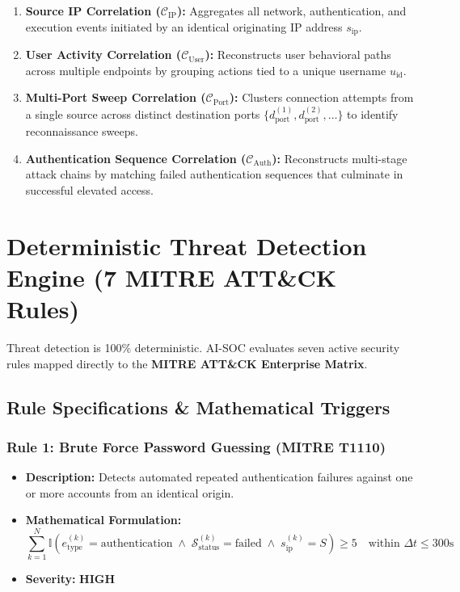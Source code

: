 \documentclass[11pt,a4paper]{article}
\begin{document}
\begin{enumerate}
    \item \textbf{Source IP Correlation ($\mathcal{C}_{\text{IP}}$):} Aggregates all network, authentication, and execution events initiated by an identical originating IP address $s_{\text{ip}}$.
    \item \textbf{User Activity Correlation ($\mathcal{C}_{\text{User}}$):} Reconstructs user behavioral paths across multiple endpoints by grouping actions tied to a unique username $u_{\text{id}}$.
    \item \textbf{Multi-Port Sweep Correlation ($\mathcal{C}_{\text{Port}}$):} Clusters connection attempts from a single source across distinct destination ports $\{d_{\text{port}}^{(1)}, d_{\text{port}}^{(2)}, \dots\}$ to identify reconnaissance sweeps.
    \item \textbf{Authentication Sequence Correlation ($\mathcal{C}_{\text{Auth}}$):} Reconstructs multi-stage attack chains by matching failed authentication sequences that culminate in successful elevated access.
\end{enumerate}

\section{Deterministic Threat Detection Engine (7 MITRE ATT\&CK Rules)}

Threat detection is 100\% deterministic. AI-SOC evaluates seven active security rules mapped directly to the \textbf{MITRE ATT\&CK Enterprise Matrix}.

\subsection{Rule Specifications \& Mathematical Triggers}

\subsubsection{Rule 1: Brute Force Password Guessing (MITRE T1110)}
\begin{itemize}
    \item \textbf{Description:} Detects automated repeated authentication failures against one or more accounts from an identical origin.
    \item \textbf{Mathematical Formulation:}
    \begin{equation}
        \sum_{k=1}^{N} \mathbb{I}\left( e_{\text{type}}^{(k)} = \text{authentication} \;\land\; \mathcal{S}_{\text{status}}^{(k)} = \text{failed} \;\land\; s_{\text{ip}}^{(k)} = S \right) \ge 5 \quad \text{within } \Delta t \le 300\text{s}
    \end{equation}
    \item \textbf{Severity:} \textcolor{alertorange}{\textbf{HIGH}}
\end{itemize}
\end{document}
